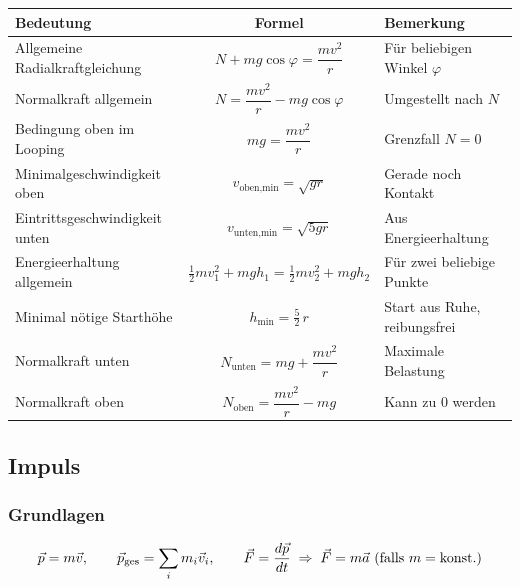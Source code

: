 \documentclass[10pt,a4paper]{article}
\begin{document}
	\begin{table}[H]
		\centering
		\begin{tabular}{|l|c|l|}
			\hline
			\rowcolor{headerblue}
			\textbf{Bedeutung} & \textbf{Formel} & \textbf{Bemerkung} \\ \hline
			
			Allgemeine Radialkraftgleichung &
			$\displaystyle N + mg\cos\varphi = \dfrac{mv^2}{r}$ &
			Für beliebigen Winkel $\varphi$ \\ \hline
			
			Normalkraft allgemein &
			$\displaystyle N = \dfrac{mv^2}{r} - mg\cos\varphi$ &
			Umgestellt nach $N$ \\ \hline
			
			Bedingung oben im Looping &
			$\displaystyle mg = \dfrac{mv^2}{r}$ &
			Grenzfall $N=0$ \\ \hline
			
			Minimalgeschwindigkeit oben &
			$\displaystyle v_{\text{oben,min}} = \sqrt{gr}$ &
			Gerade noch Kontakt \\ \hline
			
			Eintrittsgeschwindigkeit unten &
			$\displaystyle v_{\text{unten,min}} = \sqrt{5gr}$ &
			Aus Energieerhaltung \\ \hline
			
			Energieerhaltung allgemein &
			$\displaystyle \tfrac12 mv_1^2 + mgh_1 = \tfrac12 mv_2^2 + mgh_2$ &
			Für zwei beliebige Punkte \\ \hline
			
			Minimal nötige Starthöhe &
			$\displaystyle h_{\min} = \tfrac{5}{2}\, r$ &
			Start aus Ruhe, reibungsfrei \\ \hline
			
			Normalkraft unten &
			$\displaystyle N_{\text{unten}} = mg + \dfrac{mv^2}{r}$ &
			Maximale Belastung \\ \hline
			
			Normalkraft oben &
			$\displaystyle N_{\text{oben}} = \dfrac{mv^2}{r} - mg$ &
			Kann zu $0$ werden \\ \hline
		\end{tabular}
	\end{table}
	
	\subsection{Impuls}
	
	\subsubsection*{Grundlagen}
	\[
	\vec p = m\vec v,
	\qquad
	\vec p_{\rm ges} = \sum_i m_i \vec v_i,
	\qquad
	\vec F = \frac{d\vec p}{dt} \;\Rightarrow\; \vec F = m\vec a \text{ (falls } m=\text{konst.)}
	\]
	
\end{document}
